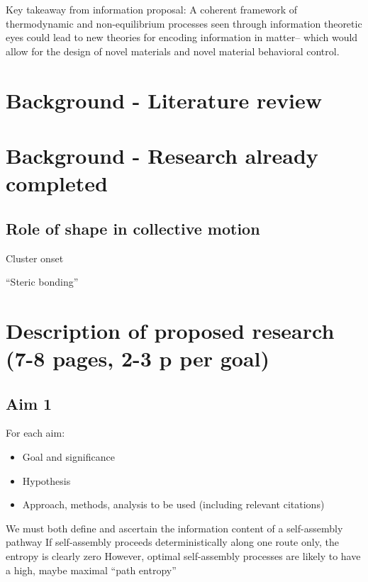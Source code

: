 \documentclass[11pt, oneside]{article}   	%
\begin{document}
Key takeaway from information proposal: A coherent framework of thermodynamic and non-equilibrium processes seen through information theoretic eyes could lead to new theories for encoding information in matter-- which would allow for the design of novel materials and novel material behavioral control.

\section{Background - Literature review}


\section{Background - Research already completed}
\subsection{Role of shape in collective motion}
Cluster onset

``Steric bonding''

\section{Description of proposed research (7-8 pages, 2-3 p per goal)}
\subsection{Aim 1}
For each aim:
\begin{itemize}
\item Goal and significance
\item Hypothesis
\item Approach, methods, analysis to be used (including relevant citations)
\end{itemize}

We must both define and ascertain the information content of a self-assembly pathway
If self-assembly proceeds deterministically along one route only, the entropy is clearly zero
However, optimal self-assembly processes are likely to have a high, maybe maximal ``path entropy''
\end{document}
